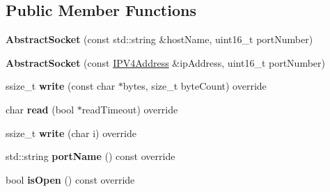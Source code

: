 \subsection*{Public Member Functions}
\begin{DoxyCompactItemize}
\item 
\mbox{\label{class_cpp_serial_port_1_1_abstract_socket_ac3340a5cd4a238884257e01f7127763c}} 
{\bfseries Abstract\+Socket} (const std\+::string \&host\+Name, uint16\+\_\+t port\+Number)
\item 
\mbox{\label{class_cpp_serial_port_1_1_abstract_socket_acc4873d15c4ee4d515900032cede1894}} 
{\bfseries Abstract\+Socket} (const \mbox{\hyperlink{class_cpp_serial_port_1_1_i_p_v4_address}{I\+P\+V4\+Address}} \&ip\+Address, uint16\+\_\+t port\+Number)
\item 
\mbox{\label{class_cpp_serial_port_1_1_abstract_socket_abba42cee89e034f7b6639bd801f2dda8}} 
ssize\+\_\+t {\bfseries write} (const char $\ast$bytes, size\+\_\+t byte\+Count) override
\item 
\mbox{\label{class_cpp_serial_port_1_1_abstract_socket_aff33e9fac306ac5b1d0df9ecb1606e57}} 
char {\bfseries read} (bool $\ast$read\+Timeout) override
\item 
\mbox{\label{class_cpp_serial_port_1_1_abstract_socket_a13755c32e2e461471598be620043873c}} 
ssize\+\_\+t {\bfseries write} (char i) override
\item 
\mbox{\label{class_cpp_serial_port_1_1_abstract_socket_a75e83f0faaad092131daa537b34a2626}} 
std\+::string {\bfseries port\+Name} () const override
\item 
\mbox{\label{class_cpp_serial_port_1_1_abstract_socket_abb4b4e7f5a17c0bea04065674a31eb2b}} 
bool {\bfseries is\+Open} () const override
\item 
\mbox{\label{class_cpp_serial_port_1_1_abstract_socket_a5f23188c33b3e610c263248ad99773a0}} 

\end{DoxyCompactItemize}
